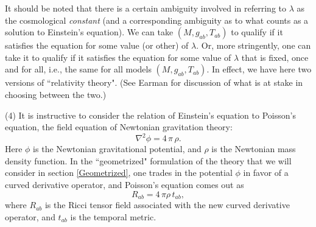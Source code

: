 \documentclass [12] {article}
\theoremstyle{plain}
\numberwithin{figure}{subsection}
\numberwithin{proposition}{subsection}
\begin{document}
It should be noted that there is a certain ambiguity involved in referring to $\lambda$ as the cosmological \emph{constant} (and a corresponding ambiguity as to what counts as a solution to Einstein's equation).  We can take  $(M,  g_{ab}, T_{ab})$ to qualify if it satisfies the equation for some value (or other) of $\lambda$. Or, more stringently, one can take it to qualify if it satisfies the equation for some value of $\lambda$ that is fixed, once and for all, i.e., the same for all models  $(M,  g_{ab}, T_{ab})$.  In effect, we have here two versions of ``relativity theory". (See Earman  for discussion of what is at stake in choosing between the two.)

(4)  It is instructive to consider the  relation of Einstein's equation to Poisson's equation, the field equation of Newtonian gravitation theory:
%
\begin{equation} \label{Poisson without}
\nabla^2  \phi = 4 \, \pi \, \rho.
\end{equation}
%
Here $\phi$ is the Newtonian gravitational potential, and $\rho$ is the Newtonian mass density function.  In the ``geometrized"  formulation of the theory that we will consider in section \ref{Geometrized},  one trades in the potential $\phi$ in favor of a curved derivative operator, and Poisson's equation comes out as 
%
\begin{equation} \label{Poisson without geometric}
R_{ab} = 4 \, \pi  \rho \,  t_{ab},
\end{equation}
%
where $R_{ab}$ is the Ricci tensor field associated with the new curved derivative operator, and $ t_{ab}$ is the temporal metric. 


\end{document}
